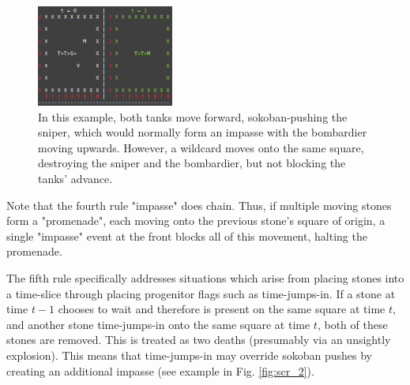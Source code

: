 \documentclass[12pt]{article}
\begin{document}
	\begin{figure}[h]
\begin{center}
   \includegraphics[width=0.4\textwidth]{images/diag_scr_1}
 \caption{In this example, both tanks move forward, sokoban-pushing the sniper, which would normally form an impasse with the bombardier moving upwards. However, a wildcard moves onto the same square, destroying the sniper and the bombardier, but not blocking the tanks' advance.}\label{fig:scr_1}
\end{center}
\end{figure}
	
	Note that the fourth rule "impasse" does chain. Thus, if multiple moving stones form a "promenade", each moving onto the previous stone's square of origin, a single "impasse" event at the front blocks all of this movement, halting the promenade.

The fifth rule specifically addresses situations which arise from placing stones into a time-slice through placing progenitor flags such as time-jumps-in. If a stone at time $t-1$ chooses to wait and therefore is present on the same square at time $t$, and another stone time-jumps-in onto the same square at time $t$, both of these stones are removed. This is treated as two deaths (presumably via an unsightly explosion). This means that time-jumps-in may override sokoban pushes by creating an additional impasse (see example in Fig. \ref{fig:scr_2}).
\end{document}
